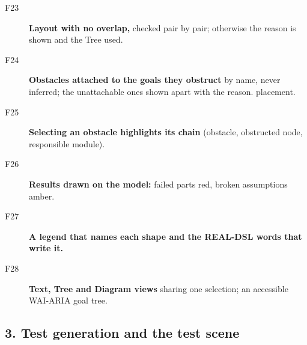 \begin{description}
\item[F23] \textbf{Layout with no overlap,} checked pair by pair; otherwise the reason is shown and the Tree used. \taginfra
\item[F24] \textbf{Obstacles attached to the goals they obstruct} by name, never inferred; the unattachable ones shown apart with the reason.  \tagnew{} placement.
\item[F25] \textbf{Selecting an obstacle highlights its chain} (obstacle, obstructed node, responsible module). \tagnew{}
\item[F26] \textbf{Results drawn on the model:} failed parts red, broken assumptions amber. \tagnew{}
\item[F27] \textbf{A legend that names each shape and the REAL-DSL words that write it.} \tagnew{}
\item[F28] \textbf{Text, Tree and Diagram views} sharing one selection; an accessible WAI-ARIA goal tree. \taginfra
\end{description}

\subsection*{3. Test generation and the test scene}

